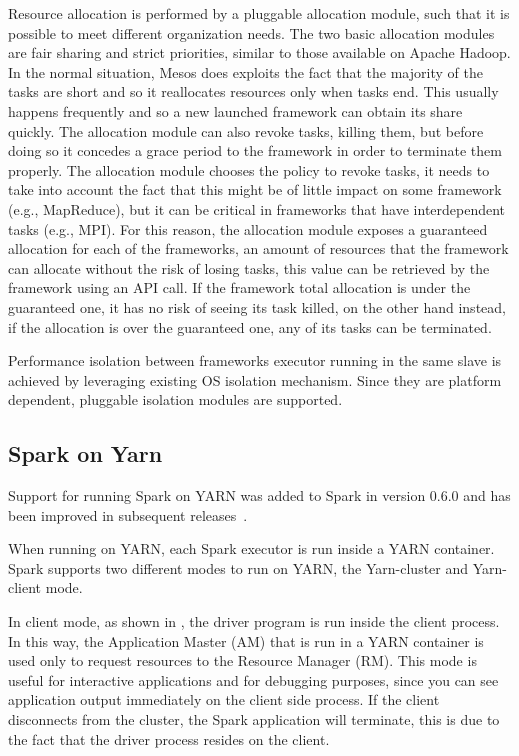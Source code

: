 Resource allocation is performed by a pluggable allocation module, such that it is possible to meet different organization needs. The two basic allocation modules are fair sharing and strict priorities, similar to those available on Apache Hadoop. In the normal situation, Mesos
does exploits the fact that the majority of the tasks are short and so it reallocates resources only when tasks end. This usually happens frequently and so a new launched framework can obtain its share quickly. The allocation module can also revoke tasks, killing them, but before doing so it concedes a grace period to the framework in order to terminate them properly. The allocation module chooses the policy to revoke tasks, it needs to take into account the fact that this might be of little impact on some framework (e.g., MapReduce), but it can be critical in frameworks that have interdependent tasks (e.g., MPI). For this reason, the allocation module exposes a guaranteed allocation for each of the frameworks, an amount of resources that
the framework can allocate without the risk of losing tasks, this value can be retrieved by the framework using an API call. If the framework total allocation is under the guaranteed one, it has no risk of seeing its task killed, on the other hand instead, if the allocation is over the
guaranteed one, any of its tasks can be terminated.

Performance isolation between frameworks executor running in the same slave is achieved by leveraging existing OS isolation mechanism. Since they are platform dependent, pluggable isolation modules are supported.

\subsection{Spark on Yarn}\label{subsec:sparkOnYarn}
Support for running Spark on YARN was added to Spark in version 0.6.0 and has been improved in subsequent releases~\cite{misc:SparkOnYarn}.

When running on YARN, each Spark executor is run inside a YARN container. Spark supports two different modes to run on YARN, the Yarn-cluster and Yarn-client mode.

In client mode, as shown in , the driver program is run inside the client process. In this way, the Application Master (AM) that is run in a YARN container is used only to request resources to the Resource Manager (RM). This mode is useful for interactive applications and for debugging purposes, since you can see application output
immediately on the client side process. If the client disconnects from the cluster, the Spark application will terminate, this is due to the fact that the driver process resides on the client.

